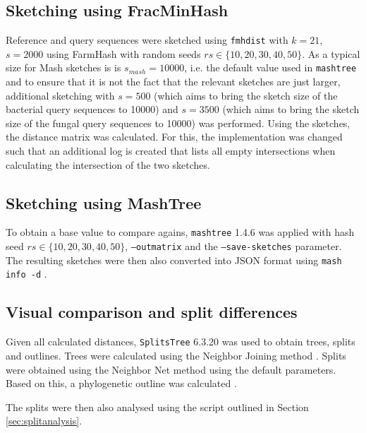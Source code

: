 \subsection*{Sketching using FracMinHash}
\label{sec:intersectionlog}
Reference and query sequences were sketched using \texttt{fmhdist} with $k=21$,
$s=2000$ using FarmHash \cite{pikeFarmhash2014,ZeroAllocationHashing2022} with
random seeds $rs \in \{10, 20, 30, 40, 50\}$. As a typical size for Mash
sketches is is $s_{mash}=10000$, i.e. the default value used in
\texttt{mashtree} \cite{katzMashtreeRapidComparison2019,ondovMashFastGenome2016}
and to ensure that it is not the fact that the relevant sketches are just
larger, additional sketching with $s=500$ (which aims to bring the sketch size
of the bacterial query sequences to 10000) and $s=3500$ (which aims to bring the
sketch size of the fungal query sequences to 10000) was performed. Using the
sketches, the distance matrix was calculated. For this, the implementation was
changed such that an additional log is created that lists all empty
intersections when calculating the intersection of the two sketches.

\subsection*{Sketching using MashTree}
To obtain a base value to compare agains, \texttt{mashtree} 1.4.6
\cite{katzMashtreeRapidComparison2019,ondovMashFastGenome2016} was applied with
hash seed $rs \in \{10, 20, 30, 40, 50\}$, \texttt{--outmatrix} and the
\texttt{--save-sketches} parameter. The resulting sketches were then also
converted into JSON format using \texttt{mash info -d}
\cite{ondovMashFastGenome2016}.

\subsection*{Visual comparison and split differences}
Given all calculated distances, \texttt{SplitsTree} 6.3.20
\cite{husonApplicationPhylogeneticNetworks2006} was used to obtain trees, splits
and outlines. Trees were calculated using the Neighbor Joining method
\cite{saitouNeighborjoiningMethodNew1987}. Splits were obtained using the
Neighbor Net method
\cite{bryantNeighborNetAgglomerativeMethod2004,bryantNeighborNetImprovedAlgorithms2023}
using the default parameters. Based on this, a phylogenetic outline was
calculated \cite{bagciMicrobialPhylogeneticContext2021}.

The splits were then also analysed using the script outlined in Section
\ref{sec:splitanalysis}.

